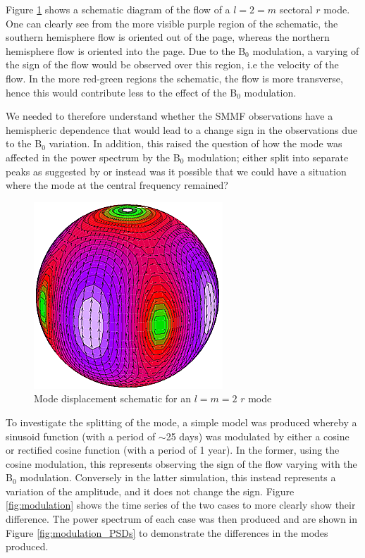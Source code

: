 Figure \ref{fig:l2m2} shows a schematic diagram of the flow of a $l=2=m$ sectoral $r$ mode. One can clearly see from the more visible purple region of the schematic, the southern hemisphere flow is oriented out of the page, whereas the northern hemisphere flow is oriented into the page. Due to the B$_0$ modulation, a varying of the sign of the flow would be observed over this region, i.e the velocity of the flow. In the more red-green regions the schematic, the flow is more transverse, hence this would contribute less to the effect of the B$_0$ modulation.

We needed to therefore understand whether the SMMF observations have a hemispheric dependence that would lead to a change sign in the observations due to the B$_0$ variation. In addition, this raised the question of how the mode was affected in the power spectrum by the B$_0$ modulation; either split into separate peaks as suggested by \citet{lanza_sectoral_2019} or instead was it possible that we could have a situation where the mode at the central frequency remained?

\begin{figure}[!ht]
	\centering
	\includegraphics[scale=0.7]{l2m2.png}
	\caption{Mode displacement schematic for an $l=m=2$ $r$ mode \citep{strohmayer_neutron_2014}}  \label{fig:l2m2}
\end{figure}

To investigate the splitting of the mode, a simple model was produced whereby a sinusoid function (with a period of $\sim$25 days) was modulated by either a cosine or rectified cosine function (with a period of 1 year). In the former, using the cosine modulation, this represents observing the sign of the flow varying with the B$_0$ modulation. Conversely in the latter simulation, this instead represents a variation of the amplitude, and it does not change the sign. Figure \ref{fig:modulation} shows the time series of the two cases to more clearly show their difference. The power spectrum of each case was then produced and are shown in Figure \ref{fig:modulation_PSDs} to demonstrate the differences in the modes produced.

